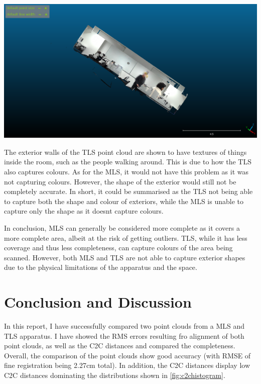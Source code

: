 \documentclass[man]{apa7}
\begin{document}
\begin{minipage}{\linewidth}
  \includegraphics[height=\textheight/4 ,width=\textwidth/2]{figures/exteriorTLS.png}
  \label{fig:exteriorArea}
\end{minipage}

The exterior walls of the TLS point cloud are shown to have textures of things inside the room, such as the people walking around. This is due to how the TLS also captures colours. As for the MLS, it would not have this problem as it was not capturing colours. However, the shape of the exterior would still not be completely accurate. In short, it could be summarised as the TLS not being able to capture both the shape and colour of exteriors, while the MLS is unable to capture only the shape as it doesnt capture colours. 

In conclusion, MLS can generally be considered more complete as it covers a more complete area, albeit at the risk of getting outliers. TLS, while it has less coverage and thus less completeness, can capture colours of the area being scanned. However, both MLS and TLS are not able to capture exterior shapes due to the physical limitations of the apparatus and the space.

\section{Conclusion and Discussion}

In this report, I have successfully compared two point clouds from a MLS and TLS apparatus. I have showed the RMS errors resulting fro alignment of both point clouds, as well as the C2C distances and compared the completeness. Overall, the comparison of the point clouds show good accuracy (with RMSE of fine registration being 2.27cm total). In addition, the C2C distances display low C2C distances dominating the distributions shown in \ref{fig:c2chistogram}. 
\end{document}
